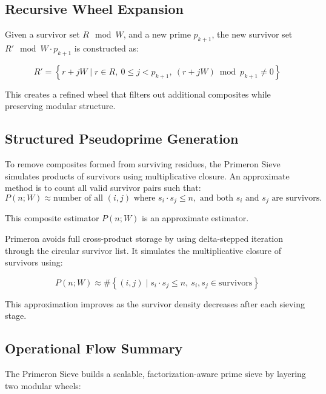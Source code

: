 \subsection{Recursive Wheel Expansion}
Given a survivor set \( R \mod W \), and a new prime \( p_{k+1} \), the new survivor set \( R' \mod W \cdot p_{k+1} \) is constructed as:

\[
R' = \left\{ r + jW \mid r \in R,\ 0 \leq j < p_{k+1},\ (r + jW) \bmod p_{k+1} \neq 0 \right\}
\]

This creates a refined wheel that filters out additional composites while preserving modular structure.

\subsection{Structured Pseudoprime Generation}
To remove composites formed from surviving residues, the Primeron Sieve simulates products of survivors using multiplicative closure.
An approximate method is to count all valid survivor pairs such that:
\[ P(n; W) \approx \text{number of all } (i, j) \text{ where } s_i \cdot s_j \leq n, \text{ and both } s_i \text{ and } s_j \text{ are survivors.} \]

This composite estimator \( P(n; W) \) is an approximate estimator.

Primeron avoids full cross-product storage by using delta-stepped iteration through the circular survivor list. It simulates the multiplicative closure of survivors using:

\[
P(n; W) \approx \#\left\{ (i, j) \mid s_i \cdot s_j \leq n,\ s_i, s_j \in \text{survivors} \right\}
\]

This approximation improves as the survivor density decreases after each sieving stage.

\subsection{Operational Flow Summary}
\label{sec:flow-overview}

The Primeron Sieve builds a scalable, factorization-aware prime sieve by layering two modular wheels:

